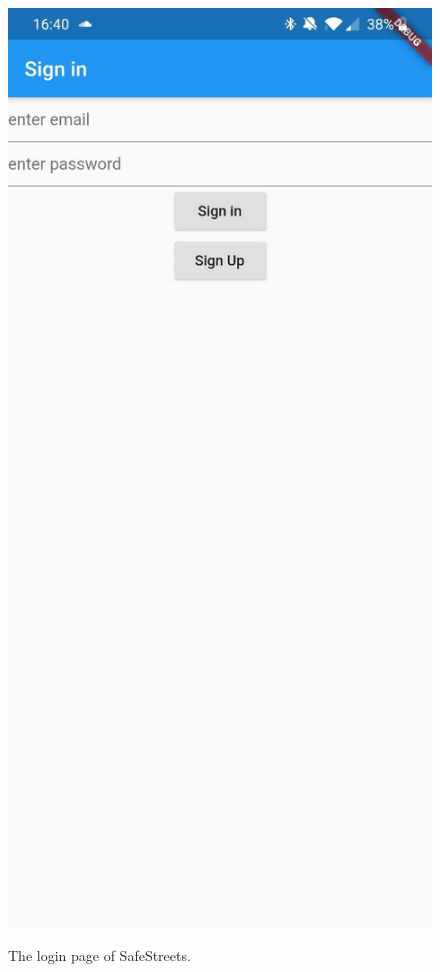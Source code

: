 \documentclass[../RASD.tex]{subfiles}
\begin{document}
    \begin{figure}[H]
        \centering
        \includegraphics[scale = 0.2]{assets/app_screenshots/login.jpg}\\
        \caption[\textit{Login} Screenshot]{The login page of SafeStreets.}
    \end{figure}
\end{document}
